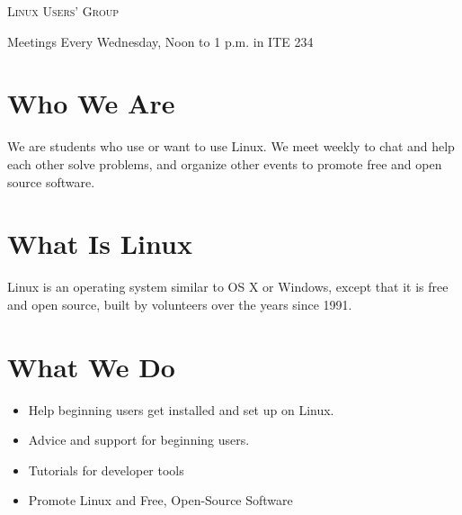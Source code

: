 \documentclass[11pt]{article}
\begin{document}
\begin{multicols*}{2}

\begin{center} \scshape \Huge
    Linux Users' Group
    \vspace{-1em}
\end{center}

\begin{center} \Large
    Meetings
    Every Wednesday, Noon to 1 p.m. in ITE 234
\end{center}

\vspace{-3em}

\section*{Who We Are}

We are students who use or want to use Linux. We meet weekly to chat and help
each other solve problems, and organize other events to promote free and open
source software.

\section*{What Is Linux}

Linux is an operating system similar to OS X or Windows, except that it is free
and open source, built by volunteers over the years since 1991.


\section*{What We Do}


\begin{itemize} \large
\item Help beginning users get installed and set up on Linux.
\item Advice and support for beginning users.
\item Tutorials for developer tools
\item Promote Linux and Free, Open-Source Software
\end{itemize}


\end{multicols*}
\end{document}
